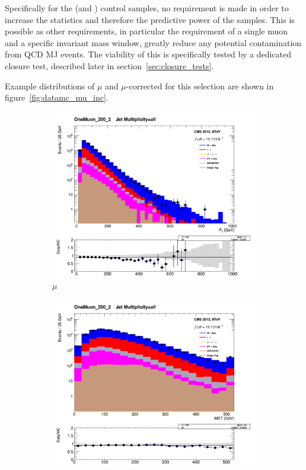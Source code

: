 Specifically for the \mj (and \mmj) control samples, no \alphat requirement is
made in order to increase the statistics and therefore the predictive power of 
the samples. This is possible as other requirements, in particular the 
requirement of
a single muon and a specific invariant mass window, greatly reduce any potential
contamination from QCD MJ events. The viability of this is specifically tested 
by a dedicated closure test, described later in section~\ref{sec:closure_tests}.

Example distributions of $\mu$ \Pt and $\mu\text{-corrected}$ \met for this selection
are shown in figure~\ref{fig:datamc_mu_inc}.

\begin{figure}[!ht]
  \centering
    \begin{subfigure}[b]{0.48\textwidth}
      \includegraphics[width=\textwidth]{Figs/datamc/mu/Stacked_MuPt_all_OneMuon_200_upwards}
      \caption{$\mu$\Pt}
    \end{subfigure}
    \begin{subfigure}[b]{0.48\textwidth}
      \includegraphics[width=\textwidth]{Figs/datamc/mu/Stacked_MET_Corrected_all_OneMuon_200_upwards}

\end{subfigure}
\end{figure}
